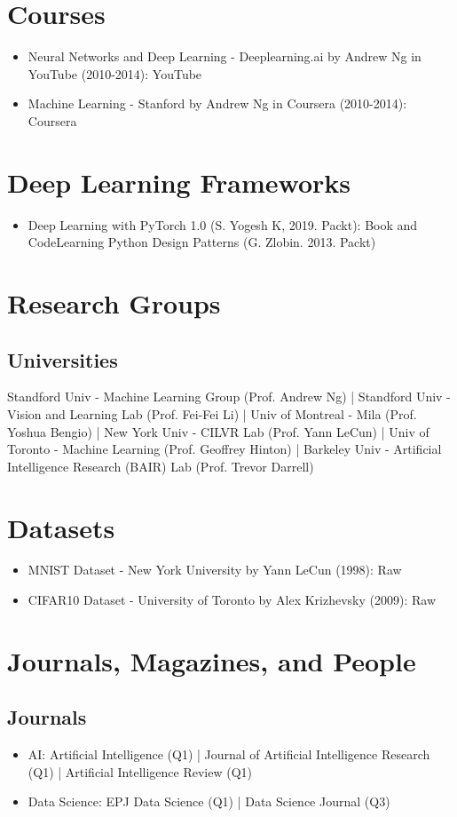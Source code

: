 \documentclass[12pt,oneside,a4paper]{article}
\begin{document}
\section{Courses}
\begin{itemize}
\item  Neural Networks and Deep Learning - Deeplearning.ai by Andrew Ng in YouTube (2010-2014): YouTube
\item Machine Learning - Stanford by Andrew Ng in Coursera (2010-2014): Coursera
\end{itemize}

\section{Deep Learning Frameworks}
\begin{itemize}
\item Deep Learning with PyTorch 1.0 (S. Yogesh K, 2019. Packt): Book and CodeLearning Python Design Patterns (G. Zlobin. 2013. Packt)
\end{itemize}

\section{Research Groups}
\subsection{Universities}
Standford Univ - Machine Learning Group (Prof. Andrew Ng) | Standford Univ - Vision and Learning Lab (Prof. Fei-Fei Li) | Univ of Montreal - Mila (Prof. Yoshua Bengio) | New York Univ - CILVR Lab (Prof. Yann LeCun) | Univ of Toronto - Machine Learning (Prof. Geoffrey Hinton) | Barkeley Univ - Artificial Intelligence Research (BAIR) Lab (Prof. Trevor Darrell)

\section{Datasets}
\begin{itemize}
\item MNIST Dataset - New York University by Yann LeCun (1998): Raw
\item CIFAR10 Dataset - University of Toronto by Alex Krizhevsky (2009): Raw
\end{itemize}

\section{Journals, Magazines, and People}
\subsection{Journals}
\begin{itemize}
\item AI: Artificial Intelligence (Q1) | Journal of Artificial Intelligence Research (Q1) | Artificial Intelligence Review (Q1)
\item Data Science: EPJ Data Science (Q1) | Data Science Journal (Q3)
\end{itemize}
\end{document}
